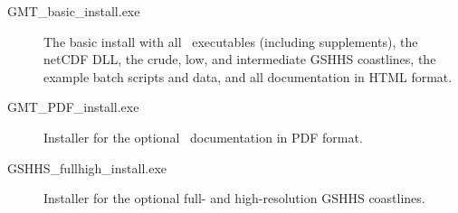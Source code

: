 \begin{description}

\item[GMT\_basic\_install.exe] The basic install with all \GMT\ executables (including supplements),
the netCDF DLL, the crude, low, and intermediate GSHHS coastlines, the example batch scripts and data, and all
documentation in HTML format.

\item[GMT\_PDF\_install.exe] Installer for the optional \GMT\ documentation in PDF format.

\item[GSHHS\_fullhigh\_install.exe] Installer for the optional full- and high-resolution GSHHS coastlines.

\end{description}

